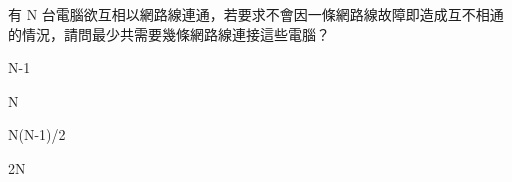 \ifx\ntpcNinetyTwo\undefined[92學年基北區] \fi
有 N 台電腦欲互相以網路線連通，若要求不會因一條網路線故障即造成互不相通的情況，請問最少共需要幾條網路線連接這些電腦？
  \begin{optionlist}
  \item N-1
  \item N\label{ntpc-92-a49}
  \item N(N-1)/2
  \item 2N
  \end{optionlist}